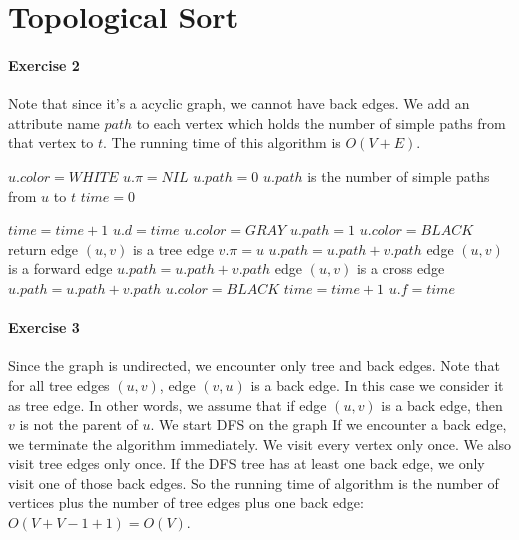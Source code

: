 \documentclass{book}
\begin{document}
	\section{Topological Sort}
	\paragraph{Exercise 2}
	Note that since it's a acyclic graph, we cannot have back edges. We add an attribute name $path$ to each vertex which holds the number of simple paths from that vertex to $t$. The running time of this algorithm is $O(V + E)$.
	\begin{algorithm*}
		\begin{algorithmic}[1]
					\State $u.color = WHITE$
					\State $u.\pi = NIL$
					\State $u.path = 0$	\Comment $u.path$ is the number of simple paths from $u$ to $t$
				\EndFor
			\State $time = 0$
			\State {}
			\EndFunction
			
				\State $time = time + 1$
				\State $u.d = time$
				\State $u.color = GRAY$
					\State $u.path = 1$
					\State $u.color = BLACK$
					\State return
				\EndIf
				\ForAll{$v \in G.adj[u]$}
					 \Comment edge $(u, v)$ is a tree edge
						\State $v.\pi = u$
						\State \Call{DFS-VISIT}{$G, v, t$}
						\State $u.path = u.path + v.path$					
						\Comment edge $(u, v)$ is a forward edge
						\State $u.path = u.path + v.path$
					\Else	\Comment edge $(u, v)$ is a cross edge
						\State $u.path = u.path + v.path$
					\EndIf
				\EndFor
				\State $u.color = BLACK$
				\State $time = time + 1$
				\State $u.f = time$
			\EndFunction
		\end{algorithmic}
	\end{algorithm*}
	\FloatBarrier	
	\paragraph{Exercise 3}
	Since the graph is undirected, we encounter only tree and back edges. Note that for all tree edges $(u, v)$, edge $(v, u)$ is a back edge. In this case we consider it as tree edge. In other words, we assume that if edge $(u, v)$ is a back edge, then $v$ is not the parent of $u$. We start DFS on the graph If we encounter a back edge, we terminate the algorithm immediately. We visit every vertex only once. We also visit tree edges only once. If the DFS tree has at least one back edge, we only visit one of those back edges. So the running time of algorithm is the number of vertices plus the number of tree edges plus one back edge: $O(V + V - 1 + 1) = O(V)$.
	
\end{document}
